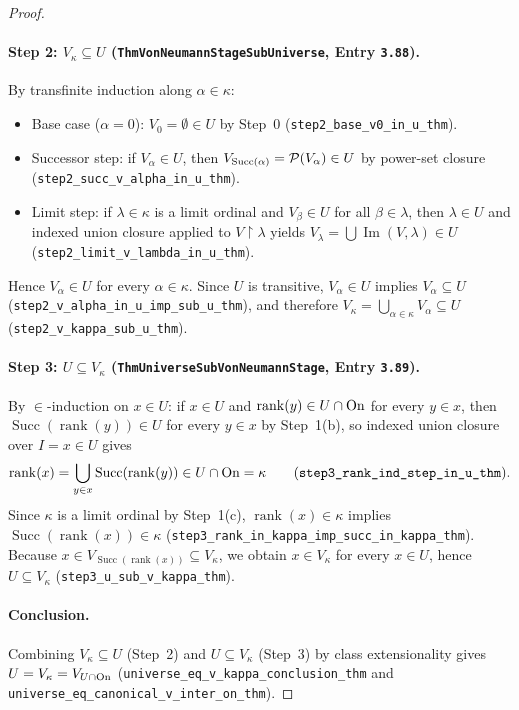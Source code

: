 \begin{proof}
\paragraph{Step 2: $V_\kappa \subseteq U$ (\texttt{ThmVonNeumannStageSubUniverse}, Entry \texttt{3.88}).}
By transfinite induction along $\alpha \in \kappa$:
\begin{itemize}
\item Base case ($\alpha = 0$): $V_0 = \emptyset \in U$ by Step~0 (\texttt{step2\_base\_v0\_in\_u\_thm}).
\item Successor step: if $V_\alpha \in U$, then $V_{\operatorname{Succ}(\alpha)} = \mathcal{P}(V_\alpha) \in U$ by power-set closure (\texttt{step2\_succ\_v\_alpha\_in\_u\_thm}).
\item Limit step: if $\lambda \in \kappa$ is a limit ordinal and $V_\beta \in U$ for all $\beta \in \lambda$, then $\lambda \in U$ and indexed union closure applied to $V \upharpoonright \lambda$ yields $V_\lambda = \bigcup\operatorname{Im}(V, \lambda) \in U$ (\texttt{step2\_limit\_v\_lambda\_in\_u\_thm}).
\end{itemize}
Hence $V_\alpha \in U$ for every $\alpha \in \kappa$. Since $U$ is transitive, $V_\alpha \in U$ implies $V_\alpha \subseteq U$ (\texttt{step2\_v\_alpha\_in\_u\_imp\_sub\_u\_thm}), and therefore $V_\kappa = \bigcup_{\alpha \in \kappa} V_\alpha \subseteq U$ (\texttt{step2\_v\_kappa_sub\_u\_thm}).

\paragraph{Step 3: $U \subseteq V_\kappa$ (\texttt{ThmUniverseSubVonNeumannStage}, Entry \texttt{3.89}).}
By $\in$-induction on $x \in U$: if $x \in U$ and $\operatorname{rank}(y) \in U \cap \mathrm{On}$ for every $y \in x$, then $\operatorname{Succ}(\operatorname{rank}(y)) \in U$ for every $y \in x$ by Step~1(b), so indexed union closure over $I = x \in U$ gives
\[
\operatorname{rank}(x) = \bigcup_{y \in x} \operatorname{Succ}(\operatorname{rank}(y)) \in U \cap \mathrm{On} = \kappa
\qquad (\texttt{step3\_rank\_ind\_step\_in\_u\_thm}).
\]
Since $\kappa$ is a limit ordinal by Step~1(c), $\operatorname{rank}(x) \in \kappa$ implies $\operatorname{Succ}(\operatorname{rank}(x)) \in \kappa$ (\texttt{step3\_rank\_in\_kappa\_imp\_succ\_in\_kappa\_thm}). Because $x \in V_{\operatorname{Succ}(\operatorname{rank}(x))} \subseteq V_\kappa$, we obtain $x \in V_\kappa$ for every $x \in U$, hence $U \subseteq V_\kappa$ (\texttt{step3\_u\_sub\_v\_kappa\_thm}).

\paragraph{Conclusion.}
Combining $V_\kappa \subseteq U$ (Step~2) and $U \subseteq V_\kappa$ (Step~3) by class extensionality gives $U = V_\kappa = V_{U \cap \mathrm{On}}$ (\texttt{universe\_eq\_v\_kappa\_conclusion\_thm} and \texttt{universe\_eq\_canonical\_v\_inter\_on\_thm}).
\end{proof}

